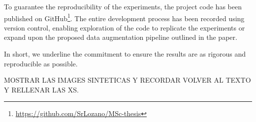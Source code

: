 To guarantee the reproducibility of the experiments, the project code has been published on GitHub\footnote{\href{https://github.com/SrLozano/MSc-thesis}{https://github.com/SrLozano/MSc-thesis}}. The entire development process has been recorded using version control, enabling exploration of the code to replicate the experiments or expand upon the proposed data augmentation pipeline outlined in the paper.

In short, we underline the commitment to ensure the results are as rigorous and reproducible as possible.






MOSTRAR LAS IMAGES SINTETICAS Y RECORDAR VOLVER AL TEXTO Y RELLENAR LAS XS.